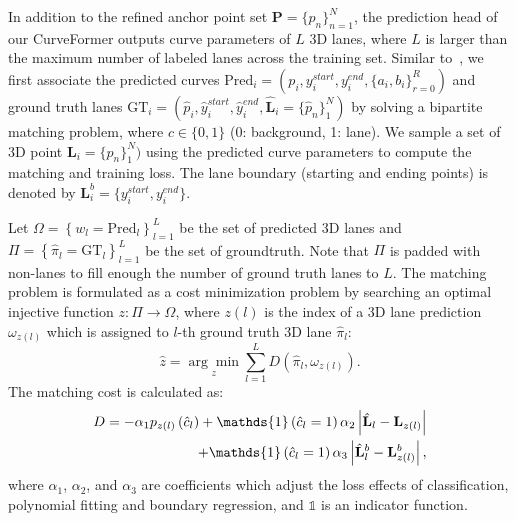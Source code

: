 \documentclass[letterpaper, 10 pt, conference]{ieeeconf}
\newcommand{\bL}{\mathbf{L}}
\newcommand{\bP}{\mathbf{P}}
\begin{document}
In addition to the refined anchor point set $\bP = \{p_n\}_{n=1}^N$, the prediction head of our CurveFormer outputs curve parameters of $L$ 3D lanes, where $L$ is larger than the maximum number of labeled lanes across the training set. 
Similar to~\cite{liu2022learning}, we first associate the predicted curves $\text{Pred}_i = (p_i, y_i^{start}, y_i^{end}, \{a_i, b_i\}_{r=0}^R)$ and ground truth lanes $\text{GT}_i = (\hat{p}_i, \hat{y}_i^{start}, \hat{y}_i^{end}, \hat{\bL}_i=\{\hat{p}_n\}_1^N)$ by solving a bipartite matching problem, where $c \in\{0,1\}$ (0: background, 1: lane). We sample a set of 3D point $\bL_i=\{p_n\}_1^N)$ using the predicted curve parameters to compute the matching and training loss. The lane boundary (starting and ending points) is denoted by $\bL_i^b=\{ y_i^{start}, y_i^{end} \}$.

Let $\Omega = \left\{ w_l = \text{Pred}_l \right\}_{l=1}^L$ be the set of predicted 3D lanes and $\Pi = \left\{ \hat{\pi}_l = \text{GT}_l \right\}_{l=1}^L$ be the set of groundtruth.
Note that $\Pi$ is padded with non-lanes to fill enough the number of ground truth lanes to $L$. The matching problem is formulated as a cost minimization problem by searching an optimal injective function $z: \Pi \rightarrow \Omega$, where $z(l)$ is the index of a 3D lane prediction $\omega_{z(l)}$ which is assigned to $l$-th ground truth 3D lane $\hat{\pi}_l$:
\begin{equation}
    \hat{z}=\underset{z}{\arg \min } \sum_{l=1}^L D\left(\hat{\pi}_l, \omega_{z(l)}\right).
\label{matching-function}
\end{equation}
The matching cost is calculated as:
\begin{align}
    D=-\alpha_1 p_{z(l)}\left(\hat{c}_l\right)+\mathds{1}\left(\hat{c}_l=1\right) \alpha_2 \left|\hat{\bL}_l-\bL_{z(l)}\right| \notag \\
    +\mathds{1}\left(\hat{c}_l=1\right) \alpha_3 \left|\hat{\bL}_l^b-\bL_{z(l)}^{b}\right|,
\label{matching-cost}
\end{align}
where $\alpha_1$, $\alpha_2$, and $\alpha_3$ are coefficients which adjust the loss effects of classification, polynomial fitting and boundary regression, and $\mathds{1}$ is an indicator function. 
\end{document}
